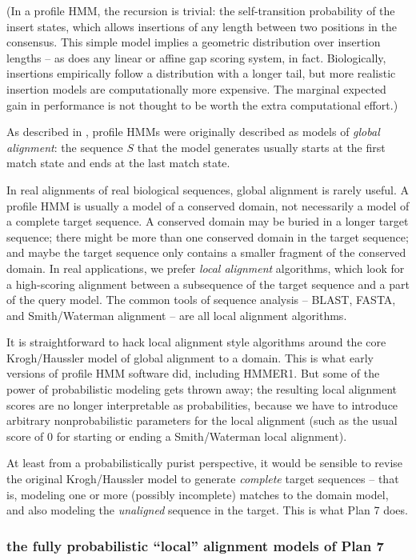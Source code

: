 (In a profile HMM, the recursion is trivial: the self-transition
probability of the insert states, which allows insertions of any
length between two positions in the consensus. This simple model
implies a geometric distribution over insertion lengths -- as does any
linear or affine gap scoring system, in fact. Biologically, insertions
empirically follow a distribution with a longer tail, but more
realistic insertion models are computationally more expensive. The
marginal expected gain in performance is not thought to be worth the
extra computational effort.)

As described in \citep{Krogh94}, profile HMMs were originally
described as models of \emph{global alignment}: the sequence $S$ that
the model generates usually starts at the first match state and ends
at the last match state.

In real alignments of real biological sequences, global alignment is
rarely useful. A profile HMM is usually a model of a conserved domain,
not necessarily a model of a complete target sequence. A conserved
domain may be buried in a longer target sequence; there might be more
than one conserved domain in the target sequence; and maybe the target
sequence only contains a smaller fragment of the conserved domain. In
real applications, we prefer \emph{local alignment} algorithms, which
look for a high-scoring alignment between a subsequence of the target
sequence and a part of the query model. The common tools of sequence
analysis -- BLAST, FASTA, and Smith/Waterman alignment -- are all
local alignment algorithms.

It is straightforward to hack local alignment style algorithms around
the core Krogh/Haussler model of global alignment to a domain.  This
is what early versions of profile HMM software did, including
HMMER1. But some of the power of probabilistic modeling gets thrown
away; the resulting local alignment scores are no longer interpretable
as probabilities, because we have to introduce arbitrary
nonprobabilistic parameters for the local alignment (such as the usual
score of 0 for starting or ending a Smith/Waterman local alignment).

At least from a probabilistically purist perspective, it would be
sensible to revise the original Krogh/Haussler model to generate
\emph{complete} target sequences -- that is, modeling one or more
(possibly incomplete) matches to the domain model, and also modeling
the \emph{unaligned} sequence in the target. This is what Plan 7 does.

\subsubsection{the fully probabilistic ``local'' alignment models of Plan 7}

